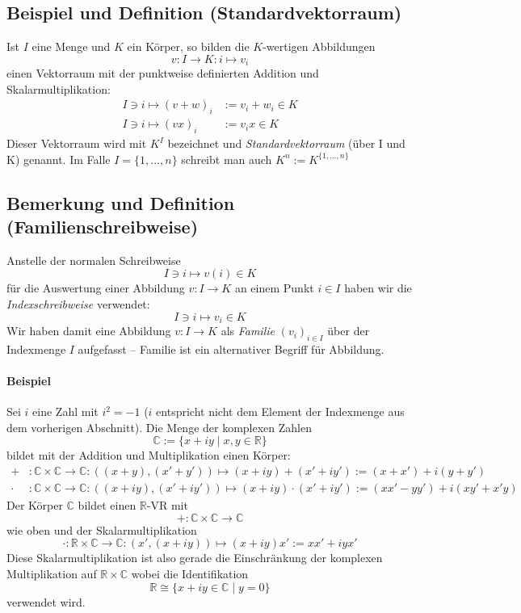 \subsection{Beispiel und Definition (Standardvektorraum)}
	\begin{Definition}[Standardvektorraum]
		Ist $ I $ eine Menge und $ K $ ein Körper, so bilden die $ K $-wertigen Abbildungen
		\[ v: I \to K: i \mapsto v_i \]
	einen Vektorraum mit der punktweise definierten Addition und Skalarmultiplikation:
	\begin{align*}
		I\ni i \mapsto (v+w)_i &:= v_i+w_i\in K\\
		I\ni i \mapsto (vx)_i &:= v_ix \in K
	\end{align*}
	Dieser Vektorraum wird mit $K^{I}$ bezeichnet und \emph{Standardvektorraum} (über I und K) genannt. Im Falle $ I=\{1,...,n\} $ schreibt man auch $K^{n} := K^{\{1,...,n\}}$
	\end{Definition}

\subsection{Bemerkung und Definition (Familienschreibweise)}
	\begin{Definition}
		Anstelle der normalen Schreibweise
		\[ I\ni i \mapsto v(i) \in K \]
	für die Auswertung einer Abbildung  $v: I \to K$ an einem Punkt $i\in I$ haben wir die \emph{Indexschreibweise} verwendet:	
		\[ I\ni i \mapsto v_i \in K \]
	Wir haben damit eine Abbildung $v: I \to K$ als \emph{Familie} $ (v_i)_{i\in I} $ über der Indexmenge $ I $ aufgefasst -- Familie ist ein \glqq alternativer\grqq{} Begriff für Abbildung.
	\end{Definition}
	
\paragraph{Beispiel}
	Sei $i$ eine \glqq Zahl\grqq{} mit $i^2=-1$ ($i$ entspricht nicht dem Element der Indexmenge aus dem vorherigen Abschnitt). Die Menge der komplexen Zahlen
		\[ \mathbb{C}:=\{{x+iy\mid x,y\in \mathbb{R}}\} \]
	bildet mit der Addition und Multiplikation einen Körper:
	\begin{align*}
		+&:\mathbb{C}\times \mathbb{C} \to \mathbb{C}: ((x+y),(x'+y')) \mapsto (x+iy)+(x'+iy') := (x+x')+i(y+y')\\
		\cdot &:\mathbb{C}\times \mathbb{C} \to \mathbb{C}: ((x+iy),(x'+iy'))\mapsto (x+iy)\cdot (x'+iy') :=(xx'-yy')+i(xy'+x'y)
	\end{align*}
	Der Körper $\mathbb{C}$ bildet einen $\mathbb{R}$-VR mit
		\[ +:\mathbb{C}\times\mathbb{C}\to\mathbb{C} \]
	wie oben und der Skalarmultiplikation
		\[ \cdot:\mathbb{R}\times\mathbb{C}\to\mathbb{C}:(x',(x+iy))\mapsto(x+iy)x':=xx'+iyx' \]
	Diese Skalarmultiplikation ist also gerade die Einschränkung der komplexen Multiplikation auf $\mathbb{R}\times\mathbb{C}$ wobei die Identifikation
		\[ \mathbb{R}\cong \{{x+iy\in\mathbb{C}\mid y=0}\} \]
	verwendet wird.
	
